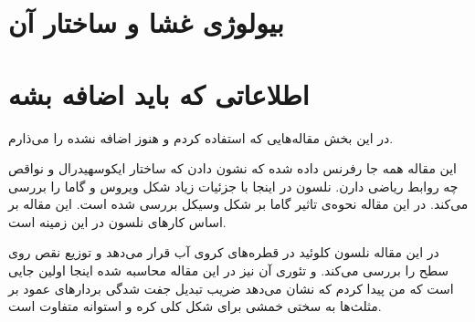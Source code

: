 \setRL
\clearpage
{} 







\section{
بیولوژی غشا و ساختار آن
}

\section{
اطلاعاتی که باید اضافه بشه
}
در این بخش مقاله‌هایی  که استفاده کردم و هنوز اضافه نشده را می‌ذارم.

این مقاله همه جا رفرنس داده شده که نشون دادن که ساختار ایکوسهیدرال و نواقص چه روابط ریاضی دارن.
\cite{CasparKlug1962}
نلسون در اینجا با جزئیات زیاد شکل ویروس و گاما را بررسی می‌کند.
\cite{nelsonPRE2003}
در این مقاله نحوه‌ی تاثیر گاما بر شکل وسیکل بررسی شده است. این مقاله بر اساس کارهای نلسون در این زمینه‌ است.
\cite{gammaPRE2005}

در این مقاله نلسون کلوئید در قطره‌های کروی آب قرار می‌دهد و توزیع نقص روی سطح را بررسی می‌کند.
\cite{NelsonScience2003}
و  تئوری آن نیز در این مقاله‌ محاسبه ‌شده
\cite{NelsonPRB2000}
اینجا اولین جایی است که  من پیدا کردم که نشان می‌دهد ضریب تبدیل جفت شدگی بردارهای عمود بر مثلث‌ها به سختی خمشی برای  شکل  کلی کره و استوانه متفاوت است. 
\cite{GompperKroll1996}












